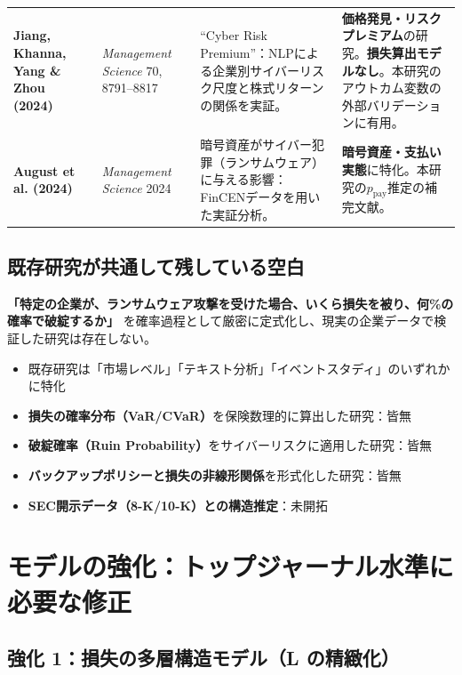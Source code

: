 \documentclass[a4paper,11pt]{article}
\theoremstyle{definition}
\begin{document}
\begin{longtable}{>{\bfseries\small}p{3.2cm}p{3cm}p{4.5cm}p{3.5cm}}
  Jiang, Khanna, Yang \& Zhou (2024) &
  \textit{Management Science} 70, 8791--8817 &
  ``Cyber Risk Premium''：NLPによる企業別サイバーリスク尺度と株式リターンの関係を実証。 &
  \textbf{価格発見・リスクプレミアム}の研究。\textbf{損失算出モデルなし}。本研究のアウトカム変数の外部バリデーションに有用。 \\

  August et al. (2024) &
  \textit{Management Science} 2024 &
  暗号資産がサイバー犯罪（ランサムウェア）に与える影響：FinCENデータを用いた実証分析。 &
  \textbf{暗号資産・支払い実態}に特化。本研究の$p_{\mathrm{pay}}$推定の補完文献。 \\
\end{longtable}

\subsection{既存研究が共通して残している空白}

\begin{tcolorbox}[gapbox, title={★ 最重要ギャップ：誰も解いていない問い}]
  \textbf{「特定の企業が、ランサムウェア攻撃を受けた場合、いくら損失を被り、何\%の確率で破綻するか」}
  を確率過程として厳密に定式化し、現実の企業データで検証した研究は存在しない。
  \begin{itemize}[leftmargin=1.5em, itemsep=1pt]
    \item 既存研究は「市場レベル」「テキスト分析」「イベントスタディ」のいずれかに特化
    \item \textbf{損失の確率分布（VaR/CVaR）}を保険数理的に算出した研究：皆無
    \item \textbf{破綻確率（Ruin Probability）}をサイバーリスクに適用した研究：皆無
    \item \textbf{バックアップポリシーと損失の非線形関係}を形式化した研究：皆無
    \item \textbf{SEC開示データ（8-K/10-K）との構造推定}：未開拓
  \end{itemize}
\end{tcolorbox}

\section{モデルの強化：トップジャーナル水準に必要な修正}
\label{sec:model_upgrade}

\subsection{強化 1：損失の多層構造モデル（L の精緻化）}
\end{document}
